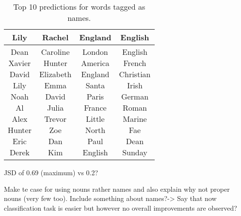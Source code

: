 \begin{table}[H]
	\centering
	\begin{tabular}{|c|c|c|c|}
		\hline
		Lily & Rachel & England & English \\ \hline
		\makecell{Dean\\Xavier\\David\\Lily\\Noah\\Al\\Alex\\Hunter\\Eric\\Derek} & \makecell{Caroline\\Hunter\\Elizabeth\\Emma\\David\\Julia\\Trevor\\Zoe\\Dan\\Kim} & \makecell{London\\America\\England\\Santa\\Paris\\France\\Little\\North\\Paul\\English} & \makecell{English\\French\\Christian\\Irish\\German\\Roman\\Marine\\Fae\\Dean\\Sunday} \\ \hline
	\end{tabular}
	\caption{Top 10 predictions for words tagged as names.}
	\label{my-label}
\end{table}

JSD of 0.69 (maximum) vs 0.2?

Make te case for using nouns rather names and also explain why not proper nouns (very few too). Include something about names?-> Say that now classification task is easier but however no overall improvements are observed?

